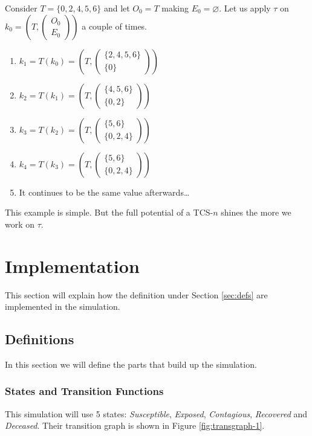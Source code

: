 \documentclass{article}
\begin{document}
Consider \(T = \{0,2,4,5,6\}\) and let \(O_0 = T\) making \(E_0 = \varnothing\). Let us apply \(\tau\) on \(k_0 = (T, \begin{pmatrix}
    O_0 \\ E_0
\end{pmatrix})\) a couple of times.

\begin{enumerate}
    \item \(k_1=T(k_0) = (T, \begin{pmatrix}
        \{2,4,5,6\} \\ \{0\}
    \end{pmatrix})\)
    \item\(k_2=T(k_1) = (T, \begin{pmatrix}
        \{4,5,6\} \\ \{0,2\}
    \end{pmatrix})\)
    \item\(k_3=T(k_2) = (T, \begin{pmatrix}
        \{5,6\} \\ \{0,2,4\}
    \end{pmatrix})\)
    \item\(k_4=T(k_3) = (T, \begin{pmatrix}
        \{5,6\} \\ \{0,2,4\}
    \end{pmatrix})\)
    \item It continues to be the same value afterwards\dots
\end{enumerate}

This example is simple. But the full potential of a TCS-\(n\) shines the more we work on \(\tau\). 

\section{Implementation}
This section will explain how the definition under Section \ref{sec:defs} are implemented in the simulation.

\subsection{Definitions}
In this section we will define the parts that build up the simulation. 

\subsubsection{States and Transition Functions}\label{sec:states}
This simulation will use 5 states: \emph{Susceptible}, \emph{Exposed}, \emph{Contagious}, \emph{Recovered} and \emph{Deceased}. Their transition graph is shown in Figure \ref{fig:transgraph-1}.
\end{document}

